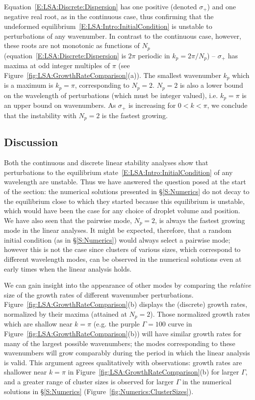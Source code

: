 Equation~\eqref{E:LSA:Discrete:Dispersion} has one positive (denoted $\sigma_+$) and one negative real root, as in the continuous case, thus confirming that the undeformed equilibrium~\eqref{E:LSA:Intro:InitialCondition} is unstable to perturbations of any wavenumber. In contrast to the continuous case, however, these roots are not monotonic as functions of $N_p$ (equation~\eqref{E:LSA:Discrete:Dispersion} is $2\pi$ periodic in $k_p=2\pi/N_p$) --  $\sigma_+$ has maxima at odd integer multiples of $\pi$ (see Figure~\ref{fig:LSA:GrowthRateComparison}(a)). The smallest wavenumber $k_p$ which is a maximum is $k_p = \pi$, corresponding to $N_p = 2$. $N_p = 2$ is also a lower bound on the wavelength of perturbations (which must be integer valued), i.e. $k_p = \pi$ is an upper bound on wavenumbers. As $\sigma_+$ is increasing for $0 < k < \pi$, we conclude that the instability with $N_p = 2$ is the fastest growing.

\subsection{Discussion}\label{S:LSA:Discussion}
Both the continuous and discrete linear stability analyses show that perturbations to the equilibrium state~\eqref{E:LSA:Intro:InitialCondition} of any wavelength are unstable. Thus we have answered the question posed at the start of the section: the numerical solutions presented in \S\ref{S:Numerics} do not decay to the equilibrium close to which they started because this equilibrium is unstable, which would have been the case for any choice of droplet volume and position. We have also seen that the pairwise mode, $N_p = 2$, is always the fastest growing mode in the linear analyses. It might be expected, therefore, that a random initial condition (as in \S\ref{S:Numerics}) would always select a pairwise mode; however this is not the case since clusters of various sizes, which correspond to different wavelength modes, can be observed in the numerical solutions even at early times when the linear analysis holds.

We can gain insight into the appearance of other modes by comparing the \emph{relative} size of the growth rates of different wavenumber perturbations. Figure~\ref{fig:LSA:GrowthRateComparison}(b) displays the (discrete) growth rates, normalized by their maxima (attained at $N_p = 2$). Those normalized growth rates which are shallow near $k = \pi$ (e.g. the purple $\Gamma  = 100$ curve in Figure~\ref{fig:LSA:GrowthRateComparison}(b)) will have similar growth rates for many of the largest possible wavenumbers; the modes corresponding to these wavenumbers will grow comparably during the period in which the linear analysis is valid. This argument agrees qualitatively with observations: growth rates are shallower near $k = \pi$ in Figure~\ref{fig:LSA:GrowthRateComparison}(b) for larger $\Gamma$, and a greater range of cluster sizes is observed for larger $\Gamma$ in the numerical solutions in \S\ref{S:Numerics} (Figure~\ref{fig:Numerics:ClusterSizes}).


